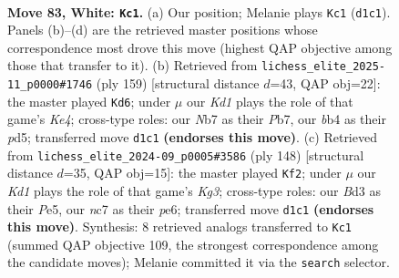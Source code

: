 \documentclass[11pt]{article}
\begin{document}
\clearpage

\begin{figure}[p]\centering
\begin{subfigure}{0.46\textwidth}\centering
\resizebox{\linewidth}{!}{%
\newchessgame
\chessboard[
  setfen={8/1Nn5/8/p3k3/Pb1pP2n/1P1B3p/4P3/3K4 w - - 32 83},
  showmover=false,
  pgfstyle=straightmove, color=movearrow, markmove={d1-c1}
]}
\caption{}
\end{subfigure}\hfill
\begin{subfigure}{0.46\textwidth}\centering
\resizebox{\linewidth}{!}{%
\newchessgame
\chessboard[
  setfen={8/1p6/1p5p/1K1Pk3/1PP2p2/4b2P/4B3/8 b - - 1 80},
  showmover=false,
  pgfstyle=straightmove, color=movearrow, markmove={e5-d6}
]}
\caption{}
\end{subfigure}
\\[4pt]
\begin{subfigure}{0.46\textwidth}\centering
\resizebox{\linewidth}{!}{%
\newchessgame
\chessboard[
  setfen={8/8/p3pBk1/Pb2P2p/1P5P/6K1/8/8 w - - 30 75},
  showmover=false,
  pgfstyle=straightmove, color=movearrow, markmove={g3-f2}
]}
\caption{}
\end{subfigure}\hfill

\caption{\textbf{Move 83, White: \texttt{Kc1}.} (a) Our position; Melanie plays \texttt{Kc1} (\texttt{d1c1}). Panels (b)--(d) are the retrieved master positions whose correspondence most drove this move (highest QAP objective among those that transfer to it). (b) Retrieved from \texttt{lichess\_elite\_2025-11\_p0000\#1746} (ply 159) [structural distance $d$=43, QAP obj=22]: the master played \texttt{Kd6}; under $\mu$ our \emph{Kd1} plays the role of that game's \emph{Ke4}; cross-type roles: our \emph{N}b7 as their \emph{P}b7, our \emph{b}b4 as their \emph{p}d5; transferred move \texttt{d1c1} \textbf{(endorses this move)}. (c) Retrieved from \texttt{lichess\_elite\_2024-09\_p0005\#3586} (ply 148) [structural distance $d$=35, QAP obj=15]: the master played \texttt{Kf2}; under $\mu$ our \emph{Kd1} plays the role of that game's \emph{Kg3}; cross-type roles: our \emph{B}d3 as their \emph{P}e5, our \emph{n}c7 as their \emph{p}e6; transferred move \texttt{d1c1} \textbf{(endorses this move)}. Synthesis: 8 retrieved analogs transferred to \texttt{Kc1} (summed QAP objective 109, the strongest correspondence among the candidate moves); Melanie committed it via the \texttt{search} selector.}
\label{fig:thought-m164}
\end{figure}

\clearpage
\end{document}
